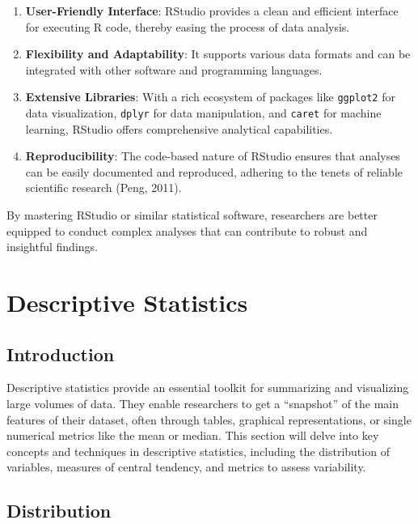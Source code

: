 \documentclass[
  b5paper]{book}
\providecommand{\tightlist}{%
  \setlength{\itemsep}{0pt}\setlength{\parskip}{0pt}}
\begin{document}
\begin{enumerate}
\def\labelenumi{\arabic{enumi}.}
\tightlist
\item
  \textbf{User-Friendly Interface}: RStudio provides a clean and efficient interface for executing R code, thereby easing the process of data analysis.
\item
  \textbf{Flexibility and Adaptability}: It supports various data formats and can be integrated with other software and programming languages.
\item
  \textbf{Extensive Libraries}: With a rich ecosystem of packages like \texttt{ggplot2} for data visualization, \texttt{dplyr} for data manipulation, and \texttt{caret} for machine learning, RStudio offers comprehensive analytical capabilities.
\item
  \textbf{Reproducibility}: The code-based nature of RStudio ensures that analyses can be easily documented and reproduced, adhering to the tenets of reliable scientific research (Peng, 2011).
\end{enumerate}

By mastering RStudio or similar statistical software, researchers are better equipped to conduct complex analyses that can contribute to robust and insightful findings.

\hypertarget{descriptive-statistics-1}{%
\section{Descriptive Statistics}\label{descriptive-statistics-1}}

\hypertarget{introduction-8}{%
\subsection{Introduction}\label{introduction-8}}

Descriptive statistics provide an essential toolkit for summarizing and visualizing large volumes of data. They enable researchers to get a ``snapshot'' of the main features of their dataset, often through tables, graphical representations, or single numerical metrics like the mean or median. This section will delve into key concepts and techniques in descriptive statistics, including the distribution of variables, measures of central tendency, and metrics to assess variability.

\hypertarget{distribution}{%
\subsection{Distribution}\label{distribution}}
\end{document}
